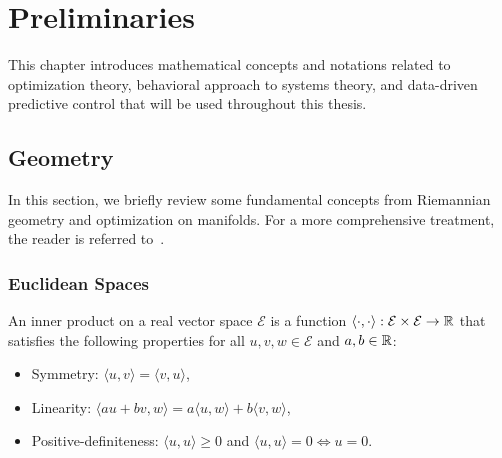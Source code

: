 \chapter{Preliminaries} \label{ch:Preliminaries}

This chapter introduces mathematical concepts and notations related to optimization theory, behavioral approach to systems theory, and data-driven predictive control that will be used throughout this thesis.

\section{Geometry} \label{sec:opt}

In this section, we briefly review some fundamental concepts from Riemannian geometry and optimization on manifolds. For a more comprehensive treatment, the reader is referred to~\cite{absil,boumal2023}.

\subsection{Euclidean Spaces}
\begin{definition}
    An inner product on a real vector space $\mathcal{E}$ is a function $\langle \cdot, \cdot \rangle : \mathcal{E} \times \mathcal{E} \to \mathbb{R}$ that satisfies the following properties for all $u,v,w \in \mathcal{E}$ and $a,b \in \mathbb{R}$:
    \begin{itemize}
        \item Symmetry: $\langle u, v \rangle = \langle v, u \rangle$,
        \item Linearity: $\langle au + bv, w \rangle = a\langle u, w \rangle + b\langle v, w \rangle$,
        \item Positive-definiteness: $\langle u, u \rangle \geq 0$ and $\langle u, u \rangle = 0 \iff u = 0$.
    \end{itemize}

\end{definition}

